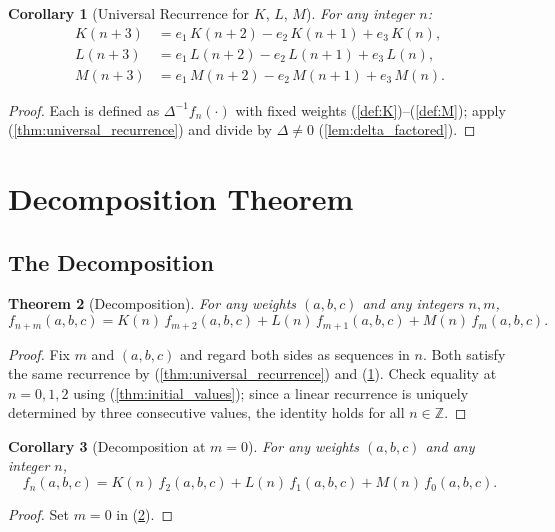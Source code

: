 \documentclass[12pt]{article}
\newtheorem{theorem}{Theorem}[section]
\newtheorem{corollary}[theorem]{Corollary}
\theoremstyle{definition}
\begin{document}
	\begin{corollary}[Universal Recurrence for $K$, $L$, $M$]
		\label{cor:recurrence_KLM}
		For any integer $n$:
		\begin{align*}
			K(n+3) &= e_1\,K(n+2) - e_2\,K(n+1) + e_3\,K(n), \\
			L(n+3) &= e_1\,L(n+2) - e_2\,L(n+1) + e_3\,L(n), \\
			M(n+3) &= e_1\,M(n+2) - e_2\,M(n+1) + e_3\,M(n).
		\end{align*}
	\end{corollary}
	\begin{proof}
		Each is defined as $\Delta^{-1} f_n(\cdot)$ with fixed weights (\ref{def:K})--(\ref{def:M}); apply (\ref{thm:universal_recurrence}) and divide by $\Delta \neq 0$ (\ref{lem:delta_factored}).
	\end{proof}
	
	\section{Decomposition Theorem}
	\label{sec:decomposition}
	
	\subsection{The Decomposition}
	\begin{theorem}[Decomposition]
		\label{thm:decomposition}
		For any weights $(a, b, c)$ and any integers $n, m$,
		\[ f_{n+m}(a,b,c) = K(n)\,f_{m+2}(a,b,c) + L(n)\,f_{m+1}(a,b,c) + M(n)\,f_m(a,b,c). \]
	\end{theorem}
	\begin{proof}
		Fix $m$ and $(a,b,c)$ and regard both sides as sequences in $n$. Both satisfy the same recurrence by (\ref{thm:universal_recurrence}) and (\ref{cor:recurrence_KLM}). Check equality at $n = 0, 1, 2$ using (\ref{thm:initial_values}); since a linear recurrence is uniquely determined by three consecutive values, the identity holds for all $n \in \mathbb{Z}$.
	\end{proof}
	
	\begin{corollary}[Decomposition at $m = 0$]
		\label{cor:decomp_m0}
		For any weights $(a, b, c)$ and any integer $n$,
		\[ f_n(a,b,c) = K(n)\,f_2(a,b,c) + L(n)\,f_1(a,b,c) + M(n)\,f_0(a,b,c). \]
	\end{corollary}
	\begin{proof}
		Set $m = 0$ in (\ref{thm:decomposition}).
	\end{proof}
	
\end{document}
